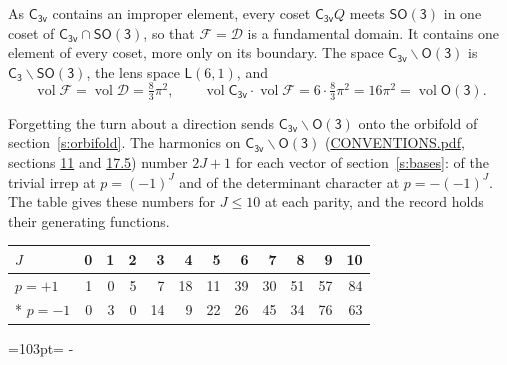 \documentclass[10pt,a4paper]{article}
\newcommand{\needspace}[1]{\par\penalty-100\begingroup\dimen0=#1\relax\dimen2=\pagegoal
  \advance\dimen2-\pagetotal\ifdim\dimen0>\dimen2\relax\ifdim\dimen2>0pt\vfil\break\fi\fi
  \endgroup}
\numberwithin{equation}{section}
\newcommand{\grp}[1]{\mathsf{#1}}
\newcommand{\vol}{\operatorname{vol}}
\newcommand{\fcell}{\mathcal{D}}
\newcommand{\fdomain}{\mathcal{F}}
\newcommand{\lensspace}[2]{\mathsf{L}(#1, #2)}
\begin{document}
\leavevmode\label{n:set.fundamental}As $\grp{C_{3v}}$ contains an improper element, every coset $\grp{C_{3v}}Q$ meets \href{SO3.pdf}{$\grp{SO(3)}$} in one coset of $\grp{C_{3v}} \cap \grp{SO(3)}$, so that $\fdomain = \fcell$ is a fundamental domain. It contains one element of every coset, more only on its boundary.
\leavevmode\label{n:set.lens}The space $\grp{C_{3v}}\backslash\grp{O(3)}$ is $\grp{C_{3}}\backslash\grp{SO(3)}$, the lens space $\lensspace{6}{1}$, and
\begin{equation}\label{e:volume}\vol\fdomain = \vol\fcell = \tfrac{8}{3}\pi^2,\qquad \vol\grp{C_{3v}}\cdot\vol\fdomain = 6\cdot \tfrac{8}{3}\pi^2 = 16\pi^2 = \vol\grp{O(3)}.\end{equation}

Forgetting the turn about a direction sends $\grp{C_{3v}}\backslash\grp{O(3)}$ onto the orbifold of section~\ref{s:orbifold}.
The harmonics on $\grp{C_{3v}}\backslash\grp{O(3)}$ (\href{../../CONVENTIONS.pdf}{CONVENTIONS.pdf}, sections \href{../../CONVENTIONS.pdf\#conv.11}{11} and \href{../../CONVENTIONS.pdf\#conv.17.5}{17.5}) number $2J + 1$ for each vector of section~\ref{s:bases}: of the trivial irrep at $p = (-1)^J$ and of the determinant character at $p = -(-1)^J$. The table gives these numbers for $J \le 10$ at each parity, and the record holds their generating functions.
{\small\setlength{\tabcolsep}{4pt}\begin{longtable}{@{}lrrrrrrrrrrr@{}}\toprule
$J$ & 0 & 1 & 2 & 3 & 4 & 5 & 6 & 7 & 8 & 9 & 10\\\midrule\endhead
\bottomrule\endfoot\endlastfoot
$p = +1$ & 1 & 0 & 5 & 7 & 18 & 11 & 39 & 30 & 51 & 57 & 84\\*
$p = -1$ & 0 & 3 & 0 & 14 & 9 & 22 & 26 & 45 & 34 & 76 & 63\\
\bottomrule\end{longtable}}
\needspace{103pt}
\end{document}
